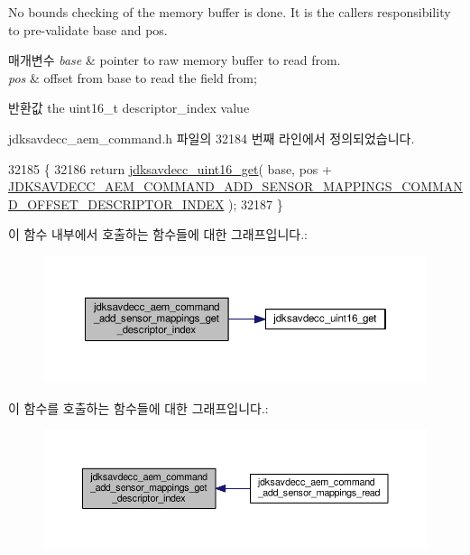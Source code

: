 No bounds checking of the memory buffer is done. It is the caller\textquotesingle{}s responsibility to pre-\/validate base and pos.


\begin{DoxyParams}{매개변수}
{\em base} & pointer to raw memory buffer to read from. \\
\hline
{\em pos} & offset from base to read the field from; \\
\hline
\end{DoxyParams}
\begin{DoxyReturn}{반환값}
the uint16\+\_\+t descriptor\+\_\+index value 
\end{DoxyReturn}


jdksavdecc\+\_\+aem\+\_\+command.\+h 파일의 32184 번째 라인에서 정의되었습니다.


\begin{DoxyCode}
32185 \{
32186     \textcolor{keywordflow}{return} \hyperlink{group__endian_ga3fbbbc20be954aa61e039872965b0dc9}{jdksavdecc\_uint16\_get}( base, pos + 
      \hyperlink{group__command__add__sensor__mappings_ga4896a96445748bbd150f394b9ba660c3}{JDKSAVDECC\_AEM\_COMMAND\_ADD\_SENSOR\_MAPPINGS\_COMMAND\_OFFSET\_DESCRIPTOR\_INDEX}
       );
32187 \}
\end{DoxyCode}


이 함수 내부에서 호출하는 함수들에 대한 그래프입니다.\+:
\nopagebreak
\begin{figure}[H]
\begin{center}
\leavevmode
\includegraphics[width=350pt]{group__command__add__sensor__mappings_ga36111be8af514db701a7f7c52899eb7c_cgraph}
\end{center}
\end{figure}




이 함수를 호출하는 함수들에 대한 그래프입니다.\+:
\nopagebreak
\begin{figure}[H]
\begin{center}
\leavevmode
\includegraphics[width=350pt]{group__command__add__sensor__mappings_ga36111be8af514db701a7f7c52899eb7c_icgraph}
\end{center}
\end{figure}


